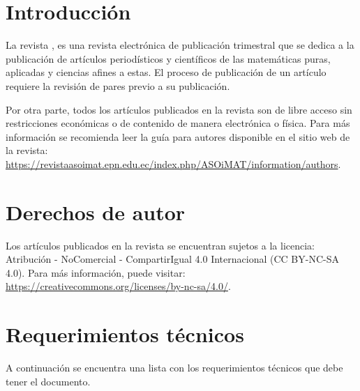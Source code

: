 \documentclass{aleph-revista}
\begin{document}
\membrete

\section{Introducción}
La revista \asoimat{}, es una revista electrónica de publicación trimestral que se dedica a la publicación de artículos periodísticos y científicos de las matemáticas puras, aplicadas y ciencias afines a estas. El proceso de publicación de un artículo requiere la revisión de pares previo a su publicación.

Por otra parte, todos los artículos publicados en la revista \asoimat son de libre acceso sin restricciones económicas o de contenido de manera electrónica o física. Para más información se recomienda leer la guía para autores disponible en el sitio web de la revista: \url{https://revistaasoimat.epn.edu.ec/index.php/ASOiMAT/information/authors}.


\section{Derechos de autor}

Los artículos publicados en la revista \asoimat se encuentran sujetos a la licencia: Atribución - NoComercial - CompartirIgual 4.0 Internacional (CC BY-NC-SA 4.0). Para más información, puede visitar: \url{https://creativecommons.org/licenses/by-nc-sa/4.0/}. 

\section{Requerimientos técnicos}

A continuación se encuentra una lista con los requerimientos técnicos que debe tener el documento.
\end{document}
